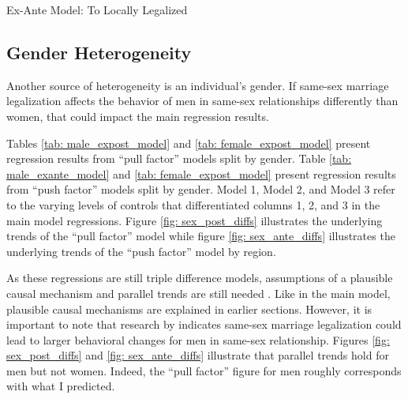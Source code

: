\documentclass[12pt,letterpaper]{article}
\begin{document}
\begin{table}[p]
    \centering
    \caption{Ex-Ante Model: To Locally Legalized}
    \label{tab: tlocal_exante_model}
    
\end{table}


\clearpage
\subsection{Gender Heterogeneity}

Another source of heterogeneity is an individual’s gender. If same-sex marriage legalization affects the behavior of men in same-sex relationships differently than women, that could impact the main regression results.

Tables \ref{tab: male_expost_model} and \ref{tab: female_expost_model} present regression results from “pull factor” models split by gender. Table \ref{tab: male_exante_model} and \ref{tab: female_expost_model} present regression results from “push factor” models split by gender. Model 1, Model 2, and Model 3 refer to the varying levels of controls that differentiated columns 1, 2, and 3 in the main model regressions.  Figure \ref{fig: sex_post_diffs} illustrates the underlying trends of the “pull factor” model while figure \ref{fig: sex_ante_diffs} illustrates the underlying trends of the “push factor” model by region.

As these regressions are still triple difference models, assumptions of a plausible causal mechanism and parallel trends are still needed \citep{24, 25}. Like in the main model, plausible causal mechanisms are explained in earlier sections. However, it is important to note that research by \citet{1, 12} indicates same-sex marriage legalization could lead to larger behavioral changes for men in same-sex relationship. Figures \ref{fig: sex_post_diffs} and \ref{fig: sex_ante_diffs} illustrate that parallel trends hold for men but not women. Indeed, the “pull factor” figure for men roughly corresponds with what I predicted.
\end{document}
